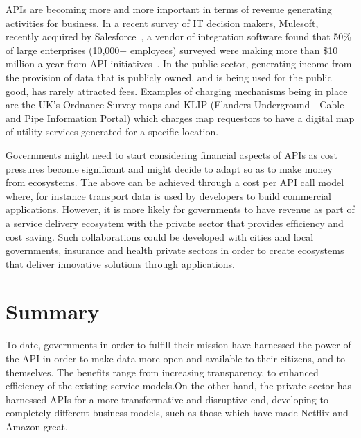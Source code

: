 APIs are becoming more and more important in terms of revenue generating activities for
business. In a recent survey of IT decision makers, Mulesoft, recently acquired
by Salesforce~\citep{mulesoft_salesforce}, a vendor of integration software found that 50\% of
large enterprises (10,000+ employees) surveyed were making more than \$10 million
a year from API initiatives~\citep{mulesoft_api_worth}. In the public sector, generating income
from the provision of data that is publicly owned, and is being used for the
public good, has rarely attracted fees. Examples of charging mechanisms being in
place are the UK’s Ordnance Survey maps and KLIP (Flanders Underground - Cable and Pipe Information Portal) which charges map requestors
to have a digital map of utility services generated for a specific location.

Governments might need to start considering financial aspects of APIs as cost pressures
become significant and might decide to adapt so as to make money from ecosystems.
The above can be achieved through a cost per API call model where, for instance transport
data is used by developers to build commercial applications. However, it is more likely for
governments to have revenue as part of a service delivery ecosystem with the private sector
that provides efficiency and cost saving. Such collaborations could be developed with cities and
local governments, insurance and health private sectors in order to create ecosystems that deliver
innovative solutions through applications.

\section{Summary}

To date, governments in order to fulfill their mission have harnessed the power of the API in order to make data more open and available to their citizens, and to themselves. The benefits range from increasing transparency, to enhanced efficiency of the existing service models.On the other hand, the private sector has harnessed APIs for a more transformative and disruptive end, developing to completely different business models, such as those which have made Netflix and
Amazon great.	

